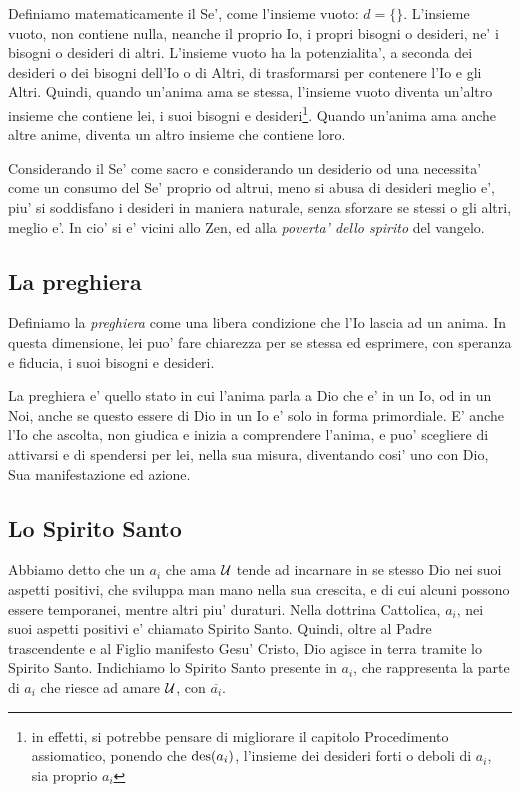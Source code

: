 Definiamo matematicamente il Se', come l'insieme vuoto: $d=\{\}$. L'insieme vuoto, non contiene nulla, neanche il proprio Io, i propri bisogni o desideri, ne' i bisogni o desideri di altri. L'insieme vuoto ha la potenzialita', a seconda dei desideri o dei bisogni dell'Io o di Altri, di trasformarsi per contenere l'Io e gli Altri. Quindi, quando un'anima ama se stessa, l'insieme vuoto diventa un'altro insieme che contiene lei, i suoi bisogni e desideri\footnote{in effetti, si potrebbe pensare di migliorare il capitolo Procedimento assiomatico, ponendo che $\textrm{des}(a_i)$, l'insieme dei desideri forti o deboli di $a_i$, sia proprio $a_i$}. Quando un'anima ama anche altre anime, diventa un altro insieme che contiene loro.

Considerando il Se' come sacro e considerando un desiderio od una necessita' come un consumo del Se' proprio od altrui, meno si abusa di desideri meglio e', piu' si soddisfano i desideri in maniera naturale, senza sforzare se stessi o gli altri, meglio e'. In cio' si e' vicini allo Zen, ed alla \emph{poverta' dello spirito} del vangelo.


\subsection{La preghiera}

Definiamo la \emph{preghiera} come una libera condizione che l'Io lascia ad un anima. In questa dimensione, lei puo' fare chiarezza per se stessa ed esprimere, con speranza e fiducia, i suoi bisogni e desideri. 

La preghiera e' quello stato in cui l'anima parla a Dio che e' in un Io, od in un Noi, anche se questo essere di Dio in un Io e' solo in forma primordiale. E' anche l'Io che ascolta, non giudica e inizia a comprendere l'anima, e puo' scegliere di attivarsi e di spendersi per lei, nella sua misura, diventando cosi' uno con Dio, Sua manifestazione ed azione.


\subsection{Lo Spirito Santo}
\label{definizioneAnimo}

\def\holySpirit#1{\overline{#1}}

Abbiamo detto che un $a_i$ che ama $\mathcal{U}$ tende ad incarnare in se stesso Dio nei suoi aspetti positivi, che sviluppa man mano nella sua crescita, e di cui alcuni possono essere temporanei, mentre altri piu' duraturi. Nella dottrina Cattolica, $a_i$, nei suoi aspetti positivi e' chiamato Spirito Santo. Quindi, oltre al Padre trascendente e al Figlio manifesto Gesu' Cristo, Dio agisce in terra tramite lo Spirito Santo. Indichiamo lo Spirito Santo presente in $a_i$, che rappresenta la parte di $a_i$ che riesce ad amare $\mathcal{U}$, con $\holySpirit{a_i}$.

